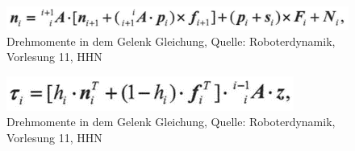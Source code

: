 	\begin{figure}[!htbp]
		\centering
		\includegraphics[width=1\linewidth]{grafic/klein_n_gleichung}
		\caption{Drehmomente in dem Gelenk Gleichung, Quelle: Roboterdynamik, Vorlesung 11, HHN}
		\label{fig:klein_n_gleichung}
	\end{figure}

	\begin{figure}[!htbp]
		\centering
		\includegraphics[width=1\linewidth]{grafic/tau_gleichung}
		\caption{Drehmomente in dem Gelenk Gleichung, Quelle: Roboterdynamik, Vorlesung 11, HHN}
		\label{fig:tau_gleichung}
	\end{figure}






